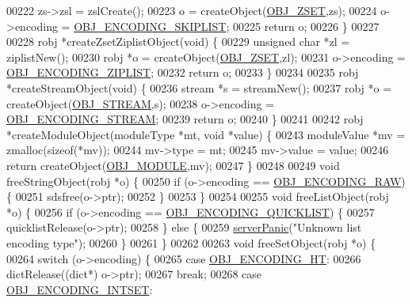 \begin{DoxyCode}
00222     zs->zsl = zslCreate();
00223     o = createObject(\hyperlink{server_8h_a8c356422ddbc03bd77694880a30a1953}{OBJ\_ZSET},zs);
00224     o->encoding = \hyperlink{server_8h_acfb35db5cb30ed113ed23aeb1a224c4c}{OBJ\_ENCODING\_SKIPLIST};
00225     \textcolor{keywordflow}{return} o;
00226 \}
00227 
00228 robj *createZsetZiplistObject(\textcolor{keywordtype}{void}) \{
00229     \textcolor{keywordtype}{unsigned} \textcolor{keywordtype}{char} *zl = ziplistNew();
00230     robj *o = createObject(\hyperlink{server_8h_a8c356422ddbc03bd77694880a30a1953}{OBJ\_ZSET},zl);
00231     o->encoding = \hyperlink{server_8h_aabf064ede983103f1fd0df2086e84eee}{OBJ\_ENCODING\_ZIPLIST};
00232     \textcolor{keywordflow}{return} o;
00233 \}
00234 
00235 robj *createStreamObject(\textcolor{keywordtype}{void}) \{
00236     stream *s = streamNew();
00237     robj *o = createObject(\hyperlink{server_8h_a2c2cc41300ca6b9daca7ea8a6d66edc6}{OBJ\_STREAM},s);
00238     o->encoding = \hyperlink{server_8h_a8ed2d5ecb3c5343c4286f9c3a2346045}{OBJ\_ENCODING\_STREAM};
00239     \textcolor{keywordflow}{return} o;
00240 \}
00241 
00242 robj *createModuleObject(moduleType *mt, \textcolor{keywordtype}{void} *value) \{
00243     moduleValue *mv = zmalloc(\textcolor{keyword}{sizeof}(*mv));
00244     mv->type = mt;
00245     mv->value = value;
00246     \textcolor{keywordflow}{return} createObject(\hyperlink{server_8h_a92c1fed85f709180fda0ff10d37d649b}{OBJ\_MODULE},mv);
00247 \}
00248 
00249 \textcolor{keywordtype}{void} freeStringObject(robj *o) \{
00250     \textcolor{keywordflow}{if} (o->encoding == \hyperlink{server_8h_a148bc85e3074e324a6dc5eebcad1bcd5}{OBJ\_ENCODING\_RAW}) \{
00251         sdsfree(o->ptr);
00252     \}
00253 \}
00254 
00255 \textcolor{keywordtype}{void} freeListObject(robj *o) \{
00256     \textcolor{keywordflow}{if} (o->encoding == \hyperlink{server_8h_aec792aeed6d4bf83966672e6a23043b8}{OBJ\_ENCODING\_QUICKLIST}) \{
00257         quicklistRelease(o->ptr);
00258     \} \textcolor{keywordflow}{else} \{
00259         \hyperlink{server_8h_a11cc378e7778a830b41240578de3b204}{serverPanic}(\textcolor{stringliteral}{"Unknown list encoding type"});
00260     \}
00261 \}
00262 
00263 \textcolor{keywordtype}{void} freeSetObject(robj *o) \{
00264     \textcolor{keywordflow}{switch} (o->encoding) \{
00265     \textcolor{keywordflow}{case} \hyperlink{server_8h_a9c10219f68afc557d510d108257d238b}{OBJ\_ENCODING\_HT}:
00266         dictRelease((dict*) o->ptr);
00267         \textcolor{keywordflow}{break};
00268     \textcolor{keywordflow}{case} \hyperlink{server_8h_a214173987de21c3b7661fddd42b05873}{OBJ\_ENCODING\_INTSET}:

\end{DoxyCode}
